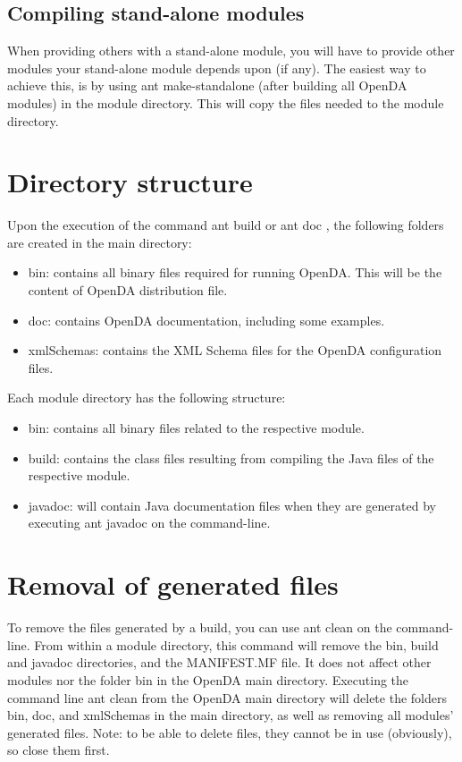 \subsection{Compiling stand-alone modules}
When providing others with a stand-alone module, you will have to provide other modules your stand-alone module depends upon (if any). The easiest way to achieve this, is by using ant make-standalone (after building all OpenDA modules) in the module directory. This will copy the files needed to the module directory.

\section{Directory structure}
Upon the execution of the command ant build or ant doc , the following folders are created in the main directory:

\begin{itemize}
\item bin: contains all binary files required for running OpenDA. This will be the content of OpenDA distribution file.
\item doc: contains OpenDA documentation, including some examples.
\item xmlSchemas: contains the XML Schema files for the OpenDA configuration files.
\end{itemize}

Each module directory has the following structure:

\begin{itemize}
\item bin: contains all binary files related to the respective module.
\item build: contains the class files resulting from compiling the Java files of the respective module.
\item javadoc: will contain Java documentation files when they are generated by executing ant javadoc on the command-line.
\end{itemize}

\section{Removal of generated files}
To remove the files generated by a build, you can use ant clean on the command-line. From within a module directory, this command will remove the bin, build and javadoc directories, and the MANIFEST.MF file. It does not affect other modules nor the folder bin in the OpenDA main directory. Executing the command line ant clean from the OpenDA main directory will delete the folders bin, doc, and xmlSchemas in the main directory, as well as removing all modules' generated files. Note: to be able to delete files, they cannot be in use (obviously), so close them first.


